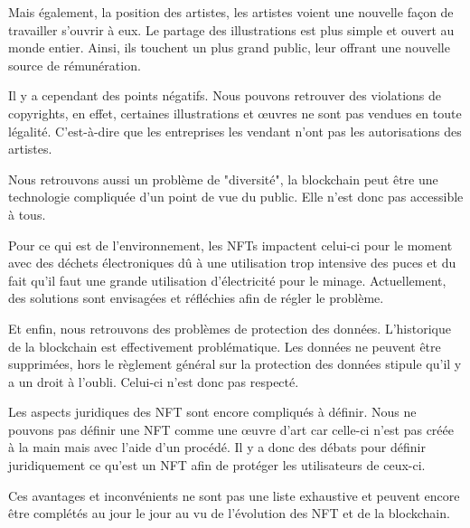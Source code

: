 \documentclass[11pt]{article}
\begin{document}
Mais également, la position des artistes, les artistes voient une nouvelle façon de travailler s'ouvrir à eux. Le partage des illustrations est plus simple et ouvert au monde entier. Ainsi, ils touchent un plus grand public, leur offrant une nouvelle source de rémunération. 

Il y a cependant des points négatifs. Nous pouvons retrouver des violations de copyrights, en effet, certaines illustrations et œuvres ne sont pas vendues en toute légalité. C'est-à-dire que les entreprises les vendant n'ont pas les autorisations des artistes. 

Nous retrouvons aussi un problème de "diversité", la blockchain peut être une technologie compliquée d'un point de vue du public. Elle n'est donc pas accessible à tous. 

Pour ce qui est de l'environnement, les NFTs impactent celui-ci pour le moment avec des déchets électroniques dû à une utilisation trop intensive des puces et du fait qu'il faut une grande utilisation d'électricité pour le minage. Actuellement, des solutions sont envisagées et réfléchies afin de régler le problème. 

Et enfin, nous retrouvons des problèmes de protection des données. L'historique de la blockchain est effectivement problématique. Les données ne peuvent être supprimées, hors le règlement général sur la protection des données stipule qu'il y a un droit à l'oubli. Celui-ci n'est donc pas respecté.

Les aspects juridiques des NFT sont encore compliqués à définir. Nous ne pouvons pas définir une NFT comme une œuvre d'art car celle-ci n'est pas créée à la main mais avec l'aide d'un procédé. Il y a donc des débats pour définir juridiquement ce qu'est un NFT afin de protéger les utilisateurs de ceux-ci.

Ces avantages et inconvénients ne sont pas une liste exhaustive et peuvent encore être complétés au jour le jour au vu de l'évolution des NFT et de la blockchain. 

\break
\printbibliography[
heading=bibintoc,
title={Bibliographie}]
\end{document}
